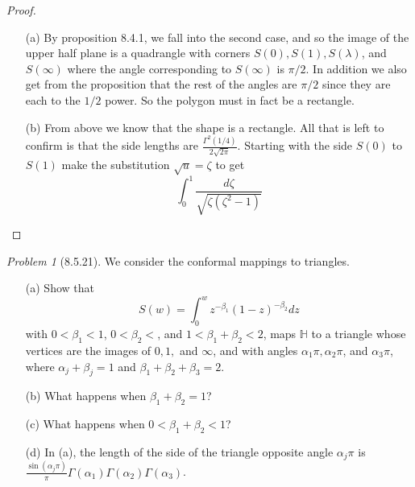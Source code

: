 \documentclass[10pt]{article}
\newcommand{\sk}{\vskip 10mm}
\newcommand{\bb}[1]{\mathbb{#1}}
\theoremstyle{remark}
\newtheorem{problem}{Problem}
\theoremstyle{remark}
\begin{document}
\begin{proof}
  \begin{enumerate}
  \item[(a)] By proposition 8.4.1, we fall into the second case, and so the
    image of the upper half plane is a quadrangle with corners $S(0),S(1),S(\lambda)$, and
    $S(\infty)$ where the angle corresponding to $S(\infty)$ is $\pi/2$. In addition we also get
    from the proposition that the rest of the angles are $\pi/2$ since they are each to
    the $1/2$ power. So the polygon must in fact be a rectangle.
  \item[(b)] From above we know that the shape is a rectangle. All that is left
    to confirm is that the side lengths are $\frac{\Gamma^2(1/4)}{2\sqrt{2\pi}}$.
    Starting with the side $S(0)$ to $S(1)$ make the substitution $\sqrt{u}=\zeta$ to get
    \[
      \int_0^1\frac{d\zeta}{\sqrt{\zeta(\zeta^2-1)}}
    \]
  \end{enumerate}
\end{proof}

\sk

\begin{problem}[8.5.21]
  We consider the conformal mappings to triangles.
  \begin{enumerate}
  \item[(a)] Show that
    \[
      S(w)=\int_0^w z^{-\beta_1}(1-z)^{-\beta_2}dz
    \]
    with $0<\beta_1<1$, $0<\beta_2<$, and $1<\beta_1+\beta_2<2$, maps $\bb{H}$
    to a triangle whose vertices are the images of $0,1,$ and
    $\infty$, and with angles $\alpha_1\pi,\alpha_2\pi$, and $\alpha_3\pi$,
    where $\alpha_j+\beta_j=1$ and $\beta_1+\beta_2+\beta_3=2$.
  \item[(b)] What happens when $\beta_1+\beta_2=1$?
  \item[(c)] What happens when $0<\beta_1+\beta_2<1$?
  \item[(d)] In (a), the length of the side of the triangle opposite angle
    $\alpha_j\pi$ is
    $\frac{\sin(\alpha_j\pi)}{\pi}\Gamma(\alpha_1)\Gamma(\alpha_2)\Gamma(\alpha_3)$.
  \end{enumerate}
\end{problem}
\end{document}
